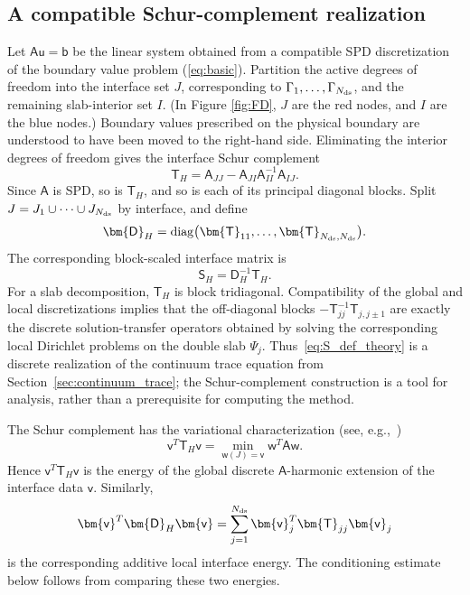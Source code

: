 \documentclass[final,onefignum,onetabnum]{siamart250211}
\newcommand{\vct}[1]{\bm{\mathsf{#1}}}
\newcommand{\mtx}[1]{\bm{\mathsf{#1}}}
\theoremstyle{definition}
\begin{document}
\subsection{A compatible Schur-complement realization}
Let $\mtx{A}\vct{u}=\vct{b}$ be the linear system obtained from a compatible SPD discretization of the boundary value problem (\ref{eq:basic}).  Partition the active degrees of freedom into the interface set $J$, corresponding to $\Gamma_1,\ldots,\Gamma_{N_{\rm ds}}$, and the remaining slab-interior set $I$.
(In Figure \ref{fig:FD}, $J$ are the red nodes, and $I$ are the blue nodes.)
Boundary values prescribed on the physical boundary are understood to have been moved to the right-hand side.  Eliminating the interior degrees of freedom gives the interface Schur complement
\begin{equation}
  \mtx{T}_H
  =\mtx{A}_{JJ}-\mtx{A}_{JI}\mtx{A}_{II}^{-1}\mtx{A}_{IJ}.
  \label{eq:T_def_theory}
\end{equation}
Since $\mtx{A}$ is SPD, so is $\mtx{T}_H$,
and so is each of its principal diagonal blocks.  Split $J=J_1\cup\cdots\cup J_{N_{\rm ds}}$ by interface, and define
\begin{equation}
  \mtx{D}_H
  =\operatorname{diag}\bigl(
    \mtx{T}_{11},\ldots,
    \mtx{T}_{N_{\rm ds},N_{\rm ds}}
  \bigr).
  \label{eq:D_def_theory}
\end{equation}
The corresponding block-scaled interface matrix is
\begin{equation}
  \mtx{S}_H=\mtx{D}_H^{-1}\mtx{T}_H.
  \label{eq:S_def_theory}
\end{equation}
For a slab decomposition, $\mtx{T}_H$ is block tridiagonal.  Compatibility of the global and local discretizations implies that the off-diagonal blocks
$
  -\mtx{T}_{jj}^{-1}\mtx{T}_{j,j\pm1}
$
are exactly the discrete solution-transfer operators obtained by solving the corresponding local Dirichlet problems on the double slab $\Psi_j$.  Thus~\eqref{eq:S_def_theory} is a discrete realization of the continuum trace equation from Section~\ref{sec:continuum_trace}; the Schur-complement construction is a tool for analysis, rather than a prerequisite for computing the method.

The Schur complement has the variational characterization (see, e.g.,~\cite{SmithSform})
\begin{equation}
  \vct{v}^T\mtx{T}_H\vct{v}
  =\min_{\vct{w}(J)=\vct{v}}
  \vct{w}^T\mtx{A}\vct{w}.
  \label{eq:schur_energy_min}
\end{equation}
Hence $\vct{v}^T\mtx{T}_H\vct{v}$ is the energy of the global discrete $\mtx{A}$-harmonic extension of the interface data $\vct{v}$.  Similarly,
\[
  \vct{v}^T\mtx{D}_H\vct{v}
  =\sum_{j=1}^{N_{\rm ds}}
    \vct{v}_j^T\mtx{T}_{jj}\vct{v}_j
\]
is the corresponding additive local interface energy.  The conditioning estimate below follows from comparing these two energies.
\end{document}
